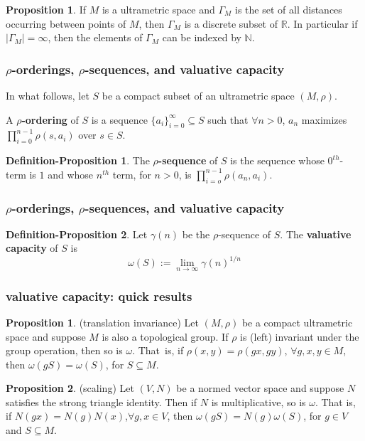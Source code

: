 \documentclass{beamer}
\theoremstyle{definition}
\newtheorem{proposition}{Proposition}
\newtheorem*{proposition*}{Proposition}
\newtheorem{definition_proposition}{Definition-Proposition}
\begin{document}
\begin{frame}
\begin{proposition}
\cite{ar} If $M$ is a ultrametric space and $\Gamma_M$ is the set of all distances occurring between points of $M$, then $\Gamma_M$ is a discrete subset of $\mathbb{R}$. In particular if $\mid \Gamma_M\mid = \infty$, then the elements of $\Gamma_M$ can be indexed by $\mathbb{N}$.
\end{proposition}
\end{frame}

\begin{frame}
\frametitle{$\rho$-orderings, $\rho$-sequences, and valuative capacity}
In what follows, let $S$ be a compact subset of an ultrametric space $(M,\rho)$.
\begin{definition}
\cite{kj} A \textbf{$\rho$-ordering} of $S$ is a sequence $\{a_i\}_{i=0}^\infty \subseteq S$ such that $\forall n > 0$, $a_n$ maximizes $\prod_{i=0}^{n-1} \rho(s,a_i)$ over $s \in S$. 
\end{definition}

\begin{definition_proposition}
\cite{kj} The \textbf{$\rho$-sequence} of $S$ is the sequence whose $0^{th}$-term is $1$ and whose $n^{th}$ term, for $n >0$, is $\prod_{i=o}^{n-1} \rho(a_n,a_i)$.
\end{definition_proposition}

\end{frame}

\begin{frame}
\frametitle{$\rho$-orderings, $\rho$-sequences, and valuative capacity}
\begin{definition_proposition}
\cite{kj}  Let $\gamma(n)$ be the $\rho$-sequence of $S$. The \textbf{valuative capacity} of $S$ is \[\omega(S)
 := \lim_{n\to\infty} \gamma(n)^{1/n}\]  
\end{definition_proposition}

\end{frame}


\begin{frame}
\frametitle{valuative capacity: quick results}
\begin{proposition*}
	(translation invariance) Let $(M, \rho)$ be a compact ultrametric space and suppose $M$ is also a topological group. If $\rho$ is (left) invariant under the group operation, then so is $\omega$. That\ is, if $\rho(x,y)=\rho(gx,gy)$, $ \forall g,x,y \in M$, then $\omega(gS)=\omega(S)$, for $S \subseteq M$.	
\end{proposition*}

\begin{proposition*}
(scaling) Let $(V, N)$ be a normed vector space and suppose $N$ satisfies the strong triangle identity. Then if $N$ is multiplicative, so is $\omega$. That is, if $N(gx)=N(g)N(x)$,$\forall g,x \in V$, then $\omega(gS) = N(g)  \omega(S)$, for $g \in V$ and $S \subseteq M$. 
\end{proposition*}
\end{frame}
\end{document}
